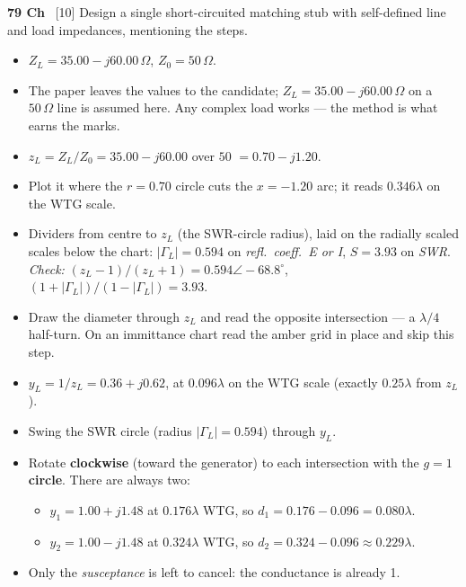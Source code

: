 \begin{asked}{\textbf{79 Ch} \ [10]}
Design a single short-circuited matching stub with self-defined line and load impedances, mentioning the steps.
\end{asked}
\begin{itemize}
  \item $Z_L = 35.00 - j60.00\,\Omega$, $Z_0 = 50\,\Omega$.
  \item \added{} The paper leaves the values to the candidate; $Z_L = 35.00 - j60.00\,\Omega$ on a $50\,\Omega$ line is assumed here. Any complex load works --- the method is what earns the marks.
\end{itemize}
\begin{itemize}
  \item $z_L = Z_L/Z_0 = 35.00 - j60.00$ over $50$ $=0.70 - j1.20$.
  \item Plot it where the $r = 0.70$ circle cuts the $x = -1.20$ arc; it reads $0.346\lambda$ on the WTG scale.
  \item Dividers from centre to $z_L$ (the SWR-circle radius), laid on the radially scaled scales below the chart: $|\Gamma_L| = 0.594$ on \emph{refl.\ coeff.\ E or I}, $S = 3.93$ on \emph{SWR}. \textit{Check:} $(z_L-1)/(z_L+1) = 0.594\angle -68.8^\circ$, $(1+|\Gamma_L|)/(1-|\Gamma_L|) = 3.93$.
\end{itemize}
\begin{itemize}
  \item Draw the diameter through $z_L$ and read the opposite intersection --- a $\lambda/4$ half-turn. On an immittance chart read the amber grid in place and skip this step.
  \item $y_L = 1/z_L = 0.36 + j0.62$, at $0.096\lambda$ on the WTG scale (exactly $0.25\lambda$ from $z_L$).
\end{itemize}
\begin{itemize}
  \item Swing the SWR circle (radius $|\Gamma_L| = 0.594$) through $y_L$.
  \item Rotate \textbf{clockwise} (toward the generator) to each intersection with the \textbf{$g=1$ circle}. There are always two:
  \begin{itemize}
    \item $y_1 = 1.00 + j1.48$ at $0.176\lambda$ WTG, so $d_1 = 0.176 - 0.096 = 0.080\lambda$.
    \item $y_2 = 1.00 - j1.48$ at $0.324\lambda$ WTG, so $d_2 = 0.324 - 0.096 \approx 0.229\lambda$.
  \end{itemize}
  \item Only the \emph{susceptance} is left to cancel: the conductance is already 1.
\end{itemize}
